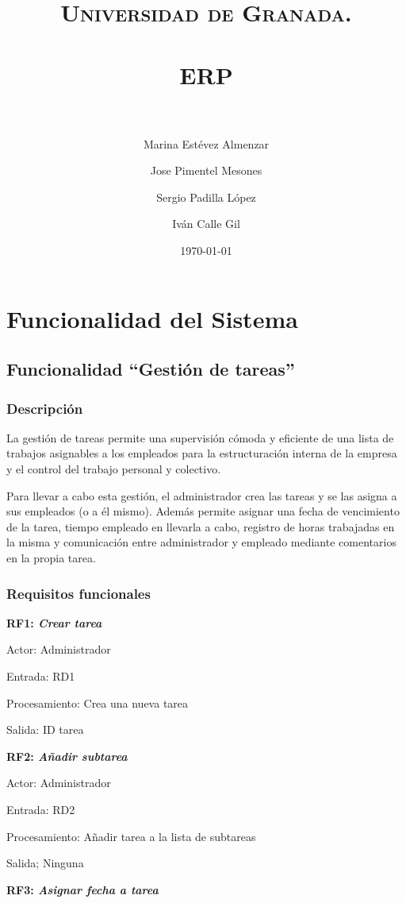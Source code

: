 \documentclass[paper=a4, fontsize=11pt, spanish]{scrartcl}
\title{
  \normalfont \normalsize
  \textsc{Universidad de Granada.} \\ [25pt]
  \horrule{0.5pt} \\[0.4cm]
  \huge ERP \\
  \horrule{2pt} \\[0.5cm]
}
\author{Marina Estévez Almenzar\\
\and
Jose Pimentel Mesones\\
\and
Sergio Padilla López\\
\and
Iván Calle Gil\\}
\date{\normalsize\today}
\begin{document}
\maketitle

\section{Funcionalidad del Sistema}

\subsection{Funcionalidad “Gestión de tareas”}

\subsubsection{Descripción}
\setlength{\parindent}{3em} La gestión de tareas permite una supervisión cómoda y eficiente de una lista de trabajos asignables a los empleados para la estructuración interna de la empresa y el control del trabajo personal y colectivo.

	Para llevar a cabo esta gestión, el administrador crea las tareas y se las asigna a sus empleados (o a él mismo). Además permite asignar una fecha de vencimiento de la tarea, tiempo empleado en llevarla a cabo, registro de horas trabajadas en la misma y comunicación entre administrador y empleado mediante comentarios en la propia tarea.

\subsubsection{Requisitos funcionales}
\setlength{\parindent}{0em}
\textbf{RF1: \textit{Crear tarea}}
\setlength{\parindent}{2em}

Actor: Administrador

Entrada: RD1

Procesamiento: Crea una nueva tarea

Salida: ID tarea

\setlength{\parindent}{0em}
\textbf{RF2: \textit{Añadir subtarea}}
\setlength{\parindent}{2em}

Actor: Administrador

Entrada: RD2

Procesamiento: Añadir tarea a la lista de subtareas

Salida; Ninguna

\setlength{\parindent}{0em}
\textbf{RF3: \textit{Asignar fecha a tarea}}
\setlength{\parindent}{2em}
\end{document}
